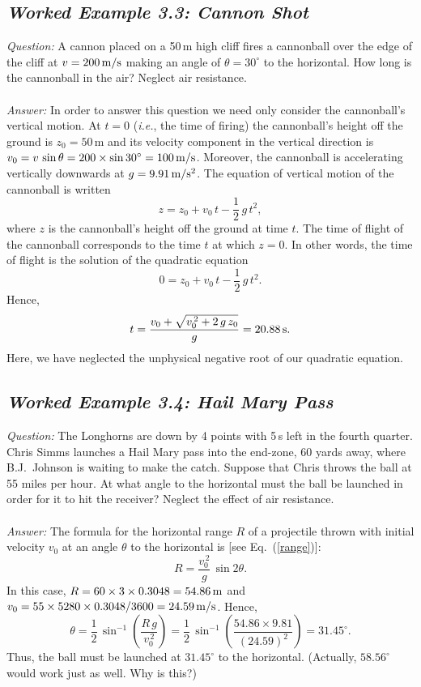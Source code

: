 \subsection*{\em Worked Example 3.3: Cannon Shot}
{\em Question:} A cannon placed on a 50\,{\rm m} high cliff 
fires a cannonball over the edge of the cliff at $v=200\,{\rm m}/{\rm s}$ making an angle
of $\theta = 30^\circ$ to the horizontal. How long is the cannonball in the air? Neglect
air resistance.\\
~\\
{\em Answer:} In order to answer this question we need only consider the cannonball's
vertical motion. At $t=0$ ({\em i.e.}, the time of firing) the cannonball's height off the
ground is $z_0=50$\,m and its velocity component in the vertical direction is
$v_0 = v\,\sin\theta = 200\times\sin 30^\circ = 100\,{\rm m}/{\rm s}$. Moreover,
the cannonball is accelerating vertically downwards at $g=9.91\,{\rm m}/{\rm s}^2$.
The equation of vertical motion of the cannonball is written
$$
z = z_0 + v_0\,t - \frac{1}{2}\,g\,t^2,
$$
where $z$ is the cannonball's height off the ground at time $t$. The time of flight
of the cannonball corresponds to the time $t$ at which $z=0$. In other words,
the time of flight is the solution of the quadratic equation
$$
0 = z_0 + v_0\,t -  \frac{1}{2}\,g\,t^2.
$$
Hence,
$$
t = \frac{v_0 +\sqrt{v_0^{\,2}+2\,g\,z_0}}{g} = 20.88\,{\rm s}.
$$
Here, we have neglected the unphysical negative root of our quadratic equation.

\subsection*{\em Worked Example 3.4: Hail Mary Pass}
{\em Question:} The Longhorns are down by 4 points with 5\,s left in the
fourth quarter. Chris Simms launches a Hail Mary pass into the end-zone,
60 yards away, where B.J.~Johnson is waiting to make the catch. Suppose
that Chris throws the ball at 55 miles per hour. At what angle to the horizontal
must the ball be launched in order for it to hit the receiver? Neglect the effect of air resistance.\\
~\\
{\em Answer:} The formula for the horizontal range $R$ of a projectile thrown
with initial velocity $v_0$ at an angle $\theta$ to the horizontal is [see
Eq.~(\ref{range})]:
$$
R= \frac{v_0^{\,2}}{g}\,\sin 2\theta.
$$
In this case, $R= 60\times 3\times 0.3048 = 54.86\,{\rm m}$ and 
$v_0 = 55\times 5280\times 0.3048/3600 = 24.59\,{\rm m/s}$. Hence,
$$
\theta = \frac{1}{2}\,\sin^{-1}\left(\frac{R\,g}{v_0^{\,2}}\right)
= \frac{1}{2} \,\sin^{-1}\left(\frac{54.86\times 9.81}{(24.59)^2}\right) =
31.45^\circ.
$$
Thus, the ball must be launched at $31.45^\circ$ to the horizontal. (Actually,
$58.56^\circ$ would  work just as well. Why is this?)

